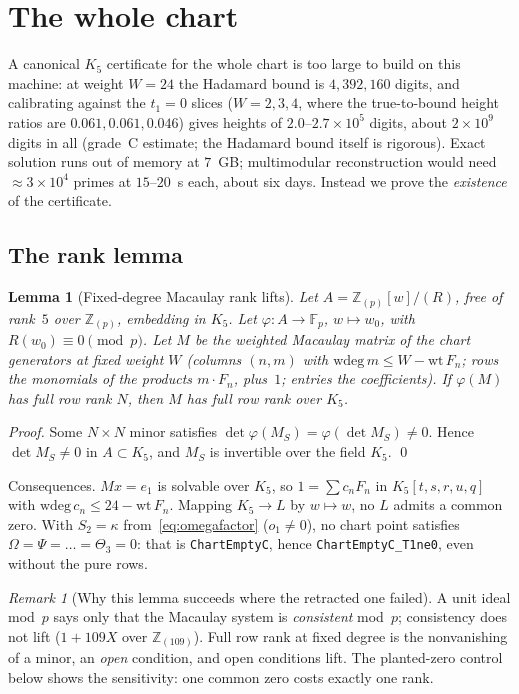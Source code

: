 \documentclass[a4paper,11pt]{article}
\theoremstyle{plain}
\newtheorem{lemma}[theorem]{Lemma}
\theoremstyle{definition}
\theoremstyle{remark}
\newtheorem{remark}[theorem]{Remark}
\begin{document}
\section{The whole chart}\label{sec:wholechart}

A canonical $K_5$ certificate for the whole chart is too large to build on this machine: at weight $W=24$ the Hadamard bound is $4{,}392{,}160$ digits, and calibrating against the $t_1=0$ slices ($W=2,3,4$, where the true-to-bound height ratios are $0.061,0.061,0.046$) gives heights of $2.0$--$2.7\times10^5$ digits, about $2\times10^9$ digits in all (grade~C estimate; the Hadamard bound itself is rigorous). Exact solution runs out of memory at $7$~GB; multimodular reconstruction would need $\approx3\times10^4$ primes at $15$--$20$~s each, about six days. Instead we prove the \emph{existence} of the certificate.

\subsection{The rank lemma}

\begin{lemma}[Fixed-degree Macaulay rank lifts]\label{lem:rank}
Let $A=\mathbb{Z}_{(p)}[w]/(R)$, free of rank~$5$ over $\mathbb{Z}_{(p)}$, embedding in $K_5$. Let $\varphi:A\to\mathbb{F}_p$, $w\mapsto w_0$, with $R(w_0)\equiv0\pmod p$. Let $M$ be the weighted Macaulay matrix of the chart generators at fixed weight $W$ (columns $(n,m)$ with $\mathrm{wdeg}\,m\le W-\mathrm{wt}\,F_n$; rows the monomials of the products $m\cdot F_n$, plus~$1$; entries the coefficients). If $\varphi(M)$ has full row rank $N$, then $M$ has full row rank over $K_5$.
\end{lemma}
\begin{proof}
Some $N\times N$ minor satisfies $\det\varphi(M_S)=\varphi(\det M_S)\ne0$. Hence $\det M_S\ne0$ in $A\subset K_5$, and $M_S$ is invertible over the field $K_5$. \qed
\end{proof}

Consequences. $Mx=e_1$ is solvable over $K_5$, so $1=\sum c_nF_n$ in $K_5[t,s,r,u,q]$ with $\mathrm{wdeg}\,c_n\le24-\mathrm{wt}\,F_n$. Mapping $K_5\to L$ by $w\mapsto w$, no $L$ admits a common zero. With $S_2=\kappa$ from~\eqref{eq:omegafactor} ($o_1\ne0$), no chart point satisfies $\Omega=\Psi=\dots=\Theta_3=0$: that is \texttt{ChartEmptyC}, hence \texttt{ChartEmptyC\_T1ne0}, even without the pure rows.

\begin{remark}[Why this lemma succeeds where the retracted one failed]
A unit ideal mod~$p$ says only that the Macaulay system is \emph{consistent} mod~$p$; consistency does not lift ($1+109X$ over $\mathbb{Z}_{(109)}$). Full row rank at fixed degree is the nonvanishing of a minor, an \emph{open} condition, and open conditions lift. The planted-zero control below shows the sensitivity: one common zero costs exactly one rank.
\end{remark}
\end{document}
